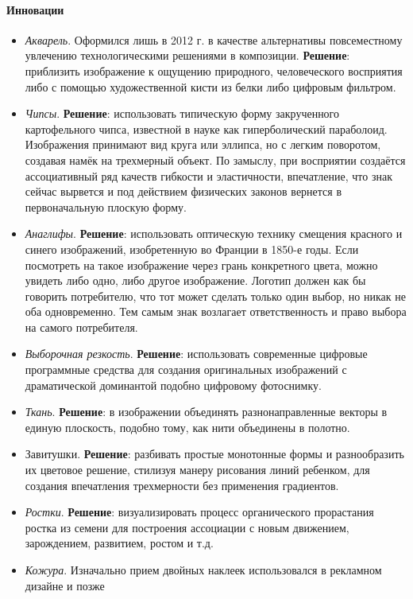 \paragraph{Инновации}
\begin{itemize}
\item \emph{Акварель}. Оформился лишь в 2012 г. в качестве альтернативы повсеместному увлечению
  технологическими решениями в композиции. \textbf{Решение}:  приблизить изображение к ощущению
  природного, человеческого восприятия либо с помощью художественной кисти из белки либо цифровым
  фильтром.
\item \emph{Чипсы}. \textbf{Решение}: использовать типическую форму закрученного картофельного
  чипса, известной в науке как гиперболический параболоид. Изображения принимают вид круга или
  эллипса, но с легким поворотом, создавая намёк на трехмерный объект. По замыслу, при восприятии
  создаётся ассоциативный ряд качеств гибкости и эластичности, впечатление, что знак сейчас
  вырвется и под действием физических законов вернется в первоначальную плоскую форму.
\item \emph{Анаглифы}. \textbf{Решение}: использовать оптическую технику смещения красного и
  синего изображений, изобретенную во Франции в 1850-е годы. Если посмотреть на такое изображение
  через грань конкретного цвета, можно увидеть либо одно, либо другое изображение. Логотип должен
  как бы говорить потребителю, что тот может сделать только один выбор, но никак не оба
  одновременно. Тем самым знак возлагает ответственность и право выбора на самого потребителя.
\item \emph{Выборочная резкость}. \textbf{Решение}: использовать современные цифровые программные
  средства для создания оригинальных изображений с драматической доминантой подобно цифровому
  фотоснимку.
\item \emph{Ткань}. \textbf{Решение}: в изображении объединять разнонаправленные векторы в единую
  плоскость, подобно тому, как нити объединены в полотно.
\item Завитушки. \textbf{Решение}: разбивать простые монотонные формы и разнообразить их цветовое
  решение, стилизуя манеру рисования линий ребенком, для создания впечатления трехмерности без
  применения градиентов.
\item \emph{Ростки}. \textbf{Решение}: визуализировать процесс органического прорастания ростка из
  семени для построения ассоциации с новым движением, зарождением, развитием, ростом и т.д.
\item \emph{Кожура}. Изначально прием двойных наклеек использовался в рекламном дизайне и позже

\end{itemize}
